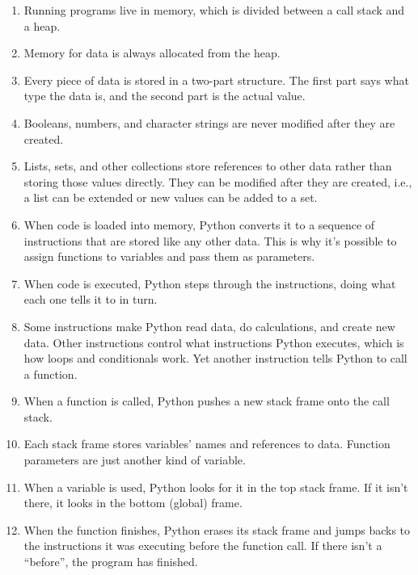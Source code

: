 \begin{enumerate}

\item
  Running programs live in memory,
  which is divided between a call stack and a heap.

\item
  Memory for data is always allocated from the heap.

\item
  Every piece of data is stored in a two-part structure.
  The first part says what type the data is,
  and the second part is the actual value.

\item
  Booleans, numbers, and character strings are never modified after they are created.

\item
  Lists, sets, and other collections store references to other data
  rather than storing those values directly.
  They can be modified after they are created,
  i.e.,
  a list can be extended or new values can be added to a set.

\item
  When code is loaded into memory,
  Python converts it to a sequence of instructions
  that are stored like any other data.
  This is why it's possible to assign functions to variables
  and pass them as parameters.

\item
  When code is executed,
  Python steps through the instructions,
  doing what each one tells it to in turn.

\item
  Some instructions make Python read data,
  do calculations,
  and create new data.
  Other instructions control what instructions Python executes,
  which is how loops and conditionals work.
  Yet another instruction tells Python to call a function.

\item
  When a function is called,
  Python pushes a new stack frame onto the call stack.

\item
  Each stack frame stores variables' names and references to data.
  Function parameters are just another kind of variable.

\item
  When a variable is used,
  Python looks for it in the top stack frame.
  If it isn't there, it looks in the bottom (global) frame.

\item
  When the function finishes,
  Python erases its stack frame and jumps backs to
  the instructions it was executing before the function call.
  If there isn't a ``before'',
  the program has finished.

\end{enumerate}

